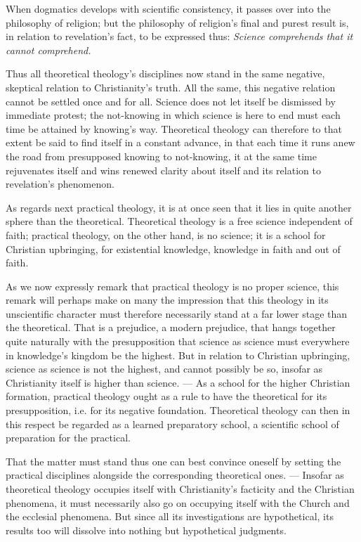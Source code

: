 \documentclass[12pt,a4paper]{book}
\begin{document}
When dogmatics develops with scientific consistency, it passes over into the philosophy of religion;
but the philosophy of religion's final and purest result is, in relation to revelation's fact, to be
expressed thus:
\emph{Science comprehends that it cannot comprehend.}

Thus all theoretical theology's disciplines now stand in the same negative, skeptical relation to
Christianity's truth. All the same, this negative relation cannot be settled once and for all. Science
does not let itself be dismissed by immediate protest; the not-knowing in which science is here to end
must each time be attained by knowing's way. Theoretical theology can therefore to that extent be said
to find itself in a constant advance, in that each time it runs anew the road from presupposed knowing
to not-knowing, it at the same time rejuvenates itself and wins renewed clarity about itself and its
relation to revelation's phenomenon.

As regards next practical theology, it is at once seen that it lies in quite another sphere than the
theoretical. Theoretical theology is a free science independent of faith; practical theology, on the
other hand, is no science;
it is a school for Christian upbringing, for existential knowledge, knowledge in faith and out of
faith.

As we now expressly remark that practical theology is no proper science, this remark will perhaps
make on many the impression that this theology in its unscientific character must therefore
necessarily stand at a far lower stage than the theoretical. That is a prejudice, a modern prejudice,
that hangs together quite naturally with the presupposition that science as science must everywhere in
knowledge's kingdom be the highest. But in relation to Christian upbringing, science as science is not
the highest, and cannot possibly be so, insofar as Christianity itself is higher than science. --- As
a school for the higher Christian formation, practical theology ought as a rule to have the
theoretical for its presupposition, i.e. for its negative foundation. Theoretical theology can then in
this respect be regarded as a learned preparatory school, a scientific school of preparation for the
practical.

That the matter must stand thus one can best convince oneself by setting the practical disciplines
alongside the corresponding theoretical ones. --- Insofar as theoretical theology occupies itself with
Christianity's facticity and the Christian phenomena, it must necessarily also go on occupying itself
with the Church and the ecclesial phenomena. But since all its investigations are hypothetical, its
results too will dissolve into nothing but hypothetical judgments.
\end{document}
